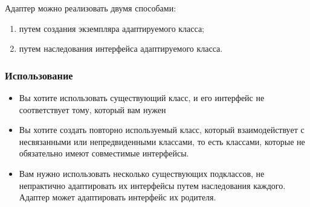 \documentclass[10pt]{article}
\begin{document}
Адаптер можно реализовать двумя способами:
\begin{enumerate}
	\item путем создания экземпляра адаптируемого класса;
	\item путем наследования интерфейса адаптируемого класса.
\end{enumerate}

\subsubsection{Использование}
\begin{itemize}
	\item Вы хотите использовать существующий класс, и его интерфейс не соответствует тому, 
		который вам нужен
	\item Вы хотите создать повторно используемый класс, который взаимодействует с
		несвязанными или непредвиденными классами, то есть классами, которые не обязательно
		имеют совместимые интерфейсы. 
	\item Вам нужно использовать несколько существующих подклассов, не непрактично адаптировать их
		интерфейсы путем наследования каждого. Адаптер может адаптировать интерфейс их родителя.
\end{itemize}
\end{document}
